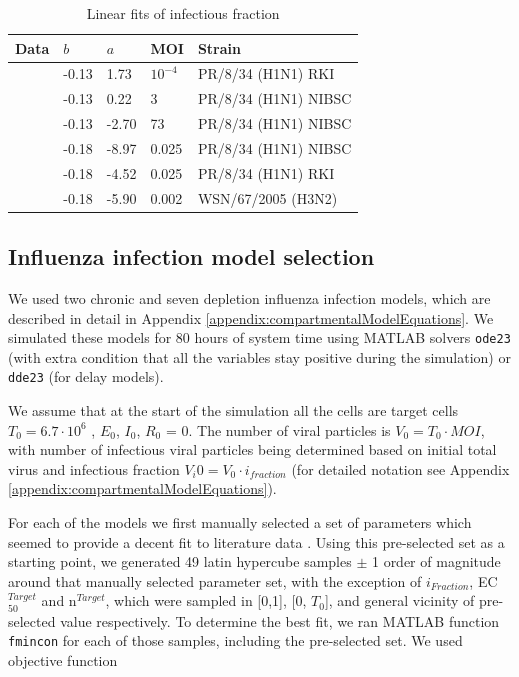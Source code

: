 \begin{table}[h!]
\centering
\caption[Linear fits of infectious fraction]{Linear fits of infectious fraction}
\label{table:linearFitsInfectiousFraction}

\begin{tabular}{p{2cm} p{2cm} p{2cm} p{2cm} p{4cm}}
\hline 
\textbf{Data} & $b$ & $a$ &  \textbf{MOI} & \textbf{Strain}\\
\hline
\cite{rudiger2019multiscale} & -0.13 & 1.73 & $10^{-4}$ & PR/8/34 (H1N1) RKI\\
\cite{rudiger2019multiscale} & -0.13 & 0.22 & 3 & PR/8/34 (H1N1) NIBSC\\
\cite{rudiger2019multiscale} & -0.13 & -2.70 & 73 & PR/8/34 (H1N1) NIBSC\\
\hline
\cite{schulze2009infection} & -0.18 & -8.97 & 0.025 & PR/8/34 (H1N1) NIBSC\\
\cite{schulze2009infection} & -0.18 & -4.52 & 0.025 & PR/8/34 (H1N1) RKI\\
\cite{schulze2009infection} & -0.18 & -5.90 & 0.002 & WSN/67/2005 (H3N2)\\
\hline
\end{tabular}
\end{table}

\subsection{Influenza infection model selection}

We used two chronic and seven depletion influenza infection models, which are described in detail in Appendix \ref{appendix:compartmentalModelEquations}. We simulated these models for 80 hours of  system time using MATLAB solvers \texttt{ode23} (with extra condition that all the variables stay positive during the simulation) or \texttt{dde23} (for delay models).

We assume that at the start of the simulation all the cells are target cells $T_0 = 6.7 \cdot 10^6$ \cite{saenz2010dynamics}, $E_0$, $I_0$, $R_0$ = 0. The number of viral particles is $V_0 = T_0 \cdot MOI$, with number of infectious viral particles being determined based on initial total virus and infectious fraction $V_i0 = V_0 \cdot i_{fraction}$ (for detailed notation see Appendix \ref{appendix:compartmentalModelEquations}).

For each of the models we first manually selected a set of parameters which seemed to provide a decent fit to literature data \cite{rudiger2019multiscale}. Using this pre-selected set as a starting point, we generated 49 latin hypercube samples $\pm$ 1 order of magnitude around that manually selected parameter set, with the exception of $i_{Fraction}$, EC$_{50}^{Target}$ and n$^{Target}$, which were sampled in [0,1], [0, $T_0$], and general vicinity of pre-selected value respectively. To determine the best fit, we ran MATLAB function \texttt{fmincon} for each of those samples, including the pre-selected set. We used objective function

